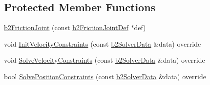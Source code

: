 \subsection*{Protected Member Functions}
\begin{DoxyCompactItemize}
\item 
\mbox{\hyperlink{classb2_friction_joint_a7413c5f289257f0e993b7e750fe95b99}{b2\+Friction\+Joint}} (const \mbox{\hyperlink{structb2_friction_joint_def}{b2\+Friction\+Joint\+Def}} $\ast$def)
\item 
void \mbox{\hyperlink{classb2_friction_joint_afce4006666e83c50d2017b5ff5e7ca2d}{Init\+Velocity\+Constraints}} (const \mbox{\hyperlink{structb2_solver_data}{b2\+Solver\+Data}} \&data) override
\item 
void \mbox{\hyperlink{classb2_friction_joint_a49109c1785d949e99a809a8c297abf13}{Solve\+Velocity\+Constraints}} (const \mbox{\hyperlink{structb2_solver_data}{b2\+Solver\+Data}} \&data) override
\item 
bool \mbox{\hyperlink{classb2_friction_joint_a4e4b64b634299136bc2c7096d5c28aa8}{Solve\+Position\+Constraints}} (const \mbox{\hyperlink{structb2_solver_data}{b2\+Solver\+Data}} \&data) override
\end{DoxyCompactItemize}
